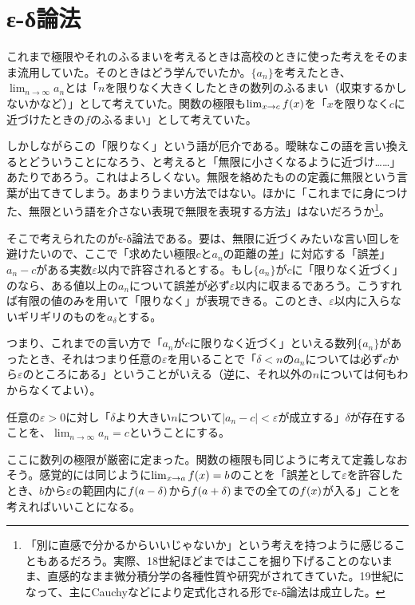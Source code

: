 \clearpage
\section{ε-δ論法}
これまで極限やそれのふるまいを考えるときは高校のときに使った考えをそのまま流用していた。そのときはどう学んでいたか。$\{a_n\}$を考えたとき、$\lim_{n\to\infty}a_n$とは「$n$を限りなく大きくしたときの数列のふるまい（収束するかしないかなど）」として考えていた。関数の極限も$\lim_{x\to c}f\pare{x}$を「$x$を限りなく$c$に近づけたときの$f$のふるまい」として考えていた。

しかしながらこの「限りなく」という語が厄介である。曖昧なこの語を言い換えるとどういうことになろう、と考えると「無限に小さくなるように近づけ……」あたりであろう。これはよろしくない。無限を絡めたものの定義に無限という言葉が出てきてしまう。あまりうまい方法ではない。ほかに「これまでに身につけた、無限という語を介さない表現で無限を表現する方法」はないだろうか\footnote{「別に直感で分かるからいいじゃないか」という考えを持つように感じることもあるだろう。実際、18世紀ほどまではここを掘り下げることのないまま、直感的なまま微分積分学の各種性質や研究がされてきていた。19世紀になって、主にCauchyなどにより定式化される形でε-δ論法は成立した。}。

そこで考えられたのがε-δ論法である。要は、無限に近づくみたいな言い回しを避けたいので、ここで「求めたい極限$c$と$a_n$の距離の差」に対応する「誤差」$a_n-c$がある実数$\varepsilon$以内で許容されるとする。もし$\{a_n\}$が$c$に「限りなく近づく」のなら、ある値以上の$a_n$について誤差が必ず$\varepsilon$以内に収まるであろう。こうすれば有限の値のみを用いて「限りなく」が表現できる。このとき、$\varepsilon$以内に入らないギリギリのものを$a_\delta$とする。

つまり、これまでの言い方で「$a_n$が$c$に限りなく近づく」といえる数列$\{a_n\}$があったとき、それはつまり任意の$\varepsilon$を用いることで「$\delta<n$の$a_n$については必ず$c$から$\varepsilon$のところにある」ということがいえる（逆に、それ以外の$n$については何もわからなくてよい）。

\begin{defi}
    任意の$\varepsilon\!>\!0$に対し「$\delta$より大きい$n$について$|a_n-c|\!<\!\varepsilon$が成立する」$\delta$が存在することを、$\lim_{n\to\infty}a_n=c$ということにする。
\end{defi}

ここに数列の極限が厳密に定まった。関数の極限も同じように考えて定義しなおそう。感覚的には同じように$\lim_{x\to{}a}f\pare{x}=b$のことを「誤差として$\varepsilon$を許容したとき、$b$から$\varepsilon$の範囲内に$f\pare{a-\delta}$から$f\pare{a+\delta}$までの全ての$f\pare{x}$が入る」ことを考えればいいことになる。

